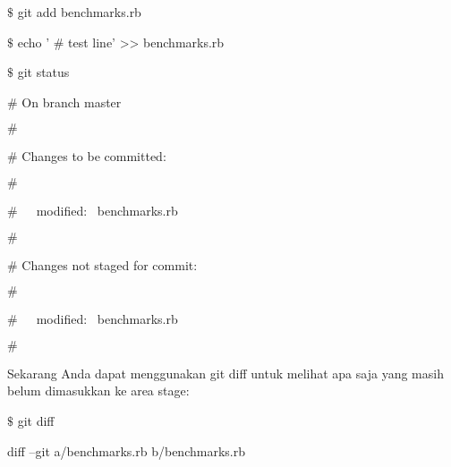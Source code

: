 \vspace{14pt}
\noindent 
{\fontsize{14pt}{14pt}\selectfont  $  \$  $ git add benchmarks.rb \\} \par
\noindent 
{\fontsize{14pt}{14pt}\selectfont  $  \$  $ echo ' $  \#  $ test line' >> benchmarks.rb \\} \par
\noindent 
{\fontsize{14pt}{14pt}\selectfont  $  \$  $ git status \\} \par
\noindent 
{\fontsize{14pt}{14pt}\selectfont  $  \#  $ On branch master \\} \par
\noindent 
{\fontsize{14pt}{14pt}\selectfont  $  \#  $ \\} \par
\noindent 
{\fontsize{14pt}{14pt}\selectfont  $  \#  $ Changes to be committed: \\} \par
\noindent 
{\fontsize{14pt}{14pt}\selectfont  $  \#  $ \\} \par
\noindent 
{\fontsize{14pt}{14pt}\selectfont  $  \#  $~~~modified:~  benchmarks.rb \\} \par
\noindent 
{\fontsize{14pt}{14pt}\selectfont  $  \#  $ \\} \par
\noindent 
{\fontsize{14pt}{14pt}\selectfont  $  \#  $ Changes not staged for commit: \\} \par
\noindent 
{\fontsize{14pt}{14pt}\selectfont  $  \#  $ \\} \par
\noindent 
{\fontsize{14pt}{14pt}\selectfont  $  \#  $~~~modified:~  benchmarks.rb \\} \par
\noindent 
{\fontsize{14pt}{14pt}\selectfont  $  \#  $ \\} \par
\noindent 
{\fontsize{14pt}{14pt}\selectfont Sekarang Anda dapat menggunakan $  $git diff $  $untuk melihat apa saja yang masih belum dimasukkan ke area stage: \\} \par
\vspace{14pt}
\noindent 
{\fontsize{14pt}{14pt}\selectfont  $  \$  $ git diff \\} \par
\noindent 
{\fontsize{14pt}{14pt}\selectfont diff --git a/benchmarks.rb b/benchmarks.rb \\} \par
